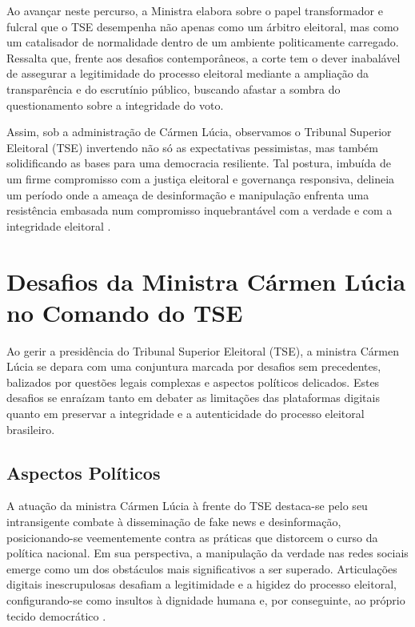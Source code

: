 \documentclass[
   article,       
   12pt,          
   oneside,       
   a4paper,       
   english,       
   brazil,        
   sumario=tradicional
   ]{abntex2}
\begin{document}
Ao avançar neste percurso, a Ministra elabora sobre o papel transformador e fulcral que o TSE desempenha não apenas como um árbitro eleitoral, mas como um catalisador de normalidade dentro de um ambiente politicamente carregado. Ressalta que, frente aos desafios contemporâneos, a corte tem o dever inabalável de assegurar a legitimidade do processo eleitoral mediante a ampliação da transparência e do escrutínio público, buscando afastar a sombra do questionamento sobre a integridade do voto.

Assim, sob a administração de Cármen Lúcia, observamos o Tribunal Superior Eleitoral (TSE) invertendo não só as expectativas pessimistas, mas também solidificando as bases para uma democracia resiliente. Tal postura, imbuída de um firme compromisso com a justiça eleitoral e governança responsiva, delineia um período onde a ameaça de desinformação e manipulação enfrenta uma resistência embasada num compromisso inquebrantável com a verdade e com a integridade eleitoral \cite{Quem_centraliza_poderes_em_uma_pessoa_chamase;}.
\section{Desafios da Ministra Cármen Lúcia no Comando do TSE}

Ao gerir a presidência do Tribunal Superior Eleitoral (TSE), a ministra Cármen Lúcia se depara com uma conjuntura marcada por desafios sem precedentes, balizados por questões legais complexas e aspectos políticos delicados. Estes desafios se enraízam tanto em debater as limitações das plataformas digitais quanto em preservar a integridade e a autenticidade do processo eleitoral brasileiro.

\subsection{Aspectos Políticos}

A atuação da ministra Cármen Lúcia à frente do TSE destaca-se pelo seu intransigente combate à disseminação de fake news e desinformação, posicionando-se veementemente contra as práticas que distorcem o curso da política nacional. Em sua perspectiva, a manipulação da verdade nas redes sociais emerge como um dos obstáculos mais significativos a ser superado. Articulações digitais inescrupulosas desafiam a legitimidade e a higidez do processo eleitoral, configurando-se como insultos à dignidade humana e, por conseguinte, ao próprio tecido democrático \cite{Carmen_Lucia_toma_posse_na_presidencia_do_TSE} \cite{Contra_o_virus_da_mentira_ha_o_remedio_da_inf}.
\end{document}
